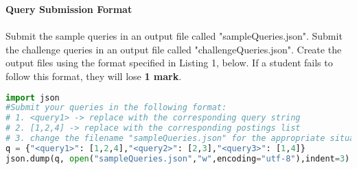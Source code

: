 \documentclass{article}
\begin{document}
\noindent
\textbf{Query Submission Format}\\
\\
\noindent
Submit the sample queries in an output file called "sampleQueries.json". Submit the challenge queries in an output file called "challengeQueries.json". Create the output files using the format specified in Listing 1, below. If a student fails to follow this format, they will lose \textbf{1 mark}. 
\\
\begin{lstlisting}[language=Python, caption=Python example]
import json
#Submit your queries in the following format:
# 1. <query1> -> replace with the corresponding query string 
# 2. [1,2,4] -> replace with the corresponding postings list
# 3. change the filename "sampleQueries.json" for the appropriate situation
q = {"<query1>": [1,2,4],"<query2>": [2,3],"<query3>": [1,4]}
json.dump(q, open("sampleQueries.json","w",encoding="utf-8"),indent=3)



\end{lstlisting}
\end{document}
